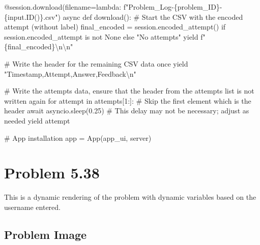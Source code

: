 \documentclass[
  letterpaper,
  DIV=11,
  numbers=noendperiod]{scrreprt}
\newenvironment{Shaded}{\begin{snugshade}}{\end{snugshade}}
\newcommand{\NormalTok}[1]{\textcolor[rgb]{0.00,0.23,0.31}{#1}}
\begin{document}
\begin{Shaded}
\begin{Highlighting}[]
\NormalTok{    @session.download(filename=lambda: f"Problem\_Log{-}\{problem\_ID\}{-}\{input.ID()\}.csv")}
\NormalTok{    async def download():}
\NormalTok{        \# Start the CSV with the encoded attempt (without label)}
\NormalTok{        final\_encoded = session.encoded\_attempt() if session.encoded\_attempt is not None else "No attempts"}
\NormalTok{        yield f"\{final\_encoded\}\textbackslash{}n\textbackslash{}n"}
        
\NormalTok{        \# Write the header for the remaining CSV data once}
\NormalTok{        yield "Timestamp,Attempt,Answer,Feedback\textbackslash{}n"}
        
\NormalTok{        \# Write the attempts data, ensure that the header from the attempts list is not written again}
\NormalTok{        for attempt in attempts[1:]:  \# Skip the first element which is the header}
\NormalTok{            await asyncio.sleep(0.25)  \# This delay may not be necessary; adjust as needed}
\NormalTok{            yield attempt}


\NormalTok{\# App installation}
\NormalTok{app = App(app\_ui, server)}
\end{Highlighting}
\end{Shaded}

\chapter*{Problem 5.38}\label{problem-5.38}


This is a dynamic rendering of the problem with dynamic variables based
on the username entered.

\section*{Problem Image}\label{problem-image-36}

\end{document}
